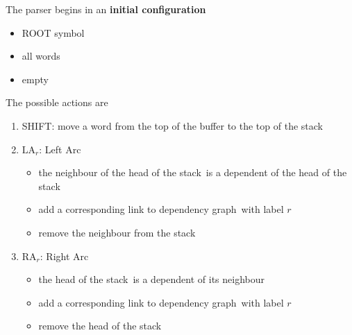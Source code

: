 \documentclass[11pt]{article}
\newcommand{\stack}{{\color{SlateGray4} stack}\ }
\newcommand{\buffer}{{\color{Orange1} buffer}\ }
\newcommand{\dependencygraph}{{\color{DodgerBlue3} dependency graph}\ }
\begin{document}
\vspace{1em}
\noindent
The parser begins in an \textbf{initial configuration}
\begin{itemize}[nosep, leftmargin=*, labelindent=3cm, labelsep=0.5cm]
	\item[\stack] ROOT symbol
	\item[\buffer] all words
	\item[\dependencygraph] empty
\end{itemize}

\vspace{1em}
\noindent
The possible actions are
\begin{enumerate}
	\item SHIFT: move a word from the top of the buffer to the top of the \stack
	\item $\text{LA}_r$: Left Arc
	\begin{itemize}[nosep]
		\item the neighbour of the head of the \stack is a dependent of the head of the \stack
		\item add a corresponding link to \dependencygraph with label $r$
		\item remove the neighbour from the \stack
	\end{itemize}
	\item $\text{RA}_r$: Right Arc
	\begin{itemize}[nosep]
		\item the head of the \stack is a dependent of its neighbour
		\item add a corresponding link to \dependencygraph with label $r$
		\item remove the head of the \stack
	\end{itemize}
\end{enumerate}
\end{document}

